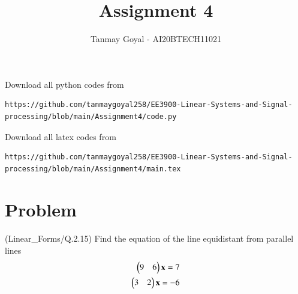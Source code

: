 \documentclass[journal,12pt,twocolumn]{IEEEtran}
\begin{document}
\def\putbox#1#2#3{\makebox[0in][l]{\makebox[#1][l]{}\raisebox{\baselineskip}[0in][0in]{\raisebox{#2}[0in][0in]{#3}}}}
     \def\rightbox#1{\makebox[0in][r]{#1}}
     \def\centbox#1{\makebox[0in]{#1}}
     \def\topbox#1{\raisebox{-\baselineskip}[0in][0in]{#1}}
     \def\midbox#1{\raisebox{-0.5\baselineskip}[0in][0in]{#1}}
\vspace{3cm}
\title{Assignment 4}
\author{Tanmay Goyal - AI20BTECH11021}
\maketitle
\newpage
\bigskip
\renewcommand{\thefigure}{\theenumi}
\renewcommand{\thetable}{\theenumi}
Download all python codes from 
\begin{lstlisting}
https://github.com/tanmaygoyal258/EE3900-Linear-Systems-and-Signal-processing/blob/main/Assignment4/code.py
\end{lstlisting}
Download all latex codes from 
\begin{lstlisting}
https://github.com/tanmaygoyal258/EE3900-Linear-Systems-and-Signal-processing/blob/main/Assignment4/main.tex
\end{lstlisting}
\section{Problem}
(Linear\_Forms/Q.2.15) Find the equation of the line equidistant from parallel lines
\begin{align}
    \begin{pmatrix}9 & 6\end{pmatrix}\mathbf{x} = 7\\
    \begin{pmatrix}3 & 2\end{pmatrix}\mathbf{x} = -6
\end{align}
\end{document}
